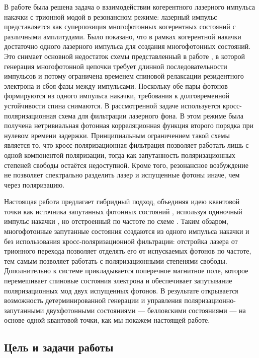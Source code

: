 \documentclass[11pt]{article}    %
\numberwithin{equation}{section}
\begin{document}
В работе \cite{krainov2025} была решена задача о
взаимодействии когерентного лазерного импульса накачки с трионной
модой в резонансном режиме: лазерный импульс представляется как
суперпозиция многофотонных когерентных состояний с различными амплитудами.
Было показано, что в рамках когерентной накачки
достаточно одного лазерного импульса для создания многофотонных состояний.
Это снимает основной недостаток схемы представленный в работе \cite{lindner2009}, в которой генерация
многофотонной цепочки требует длинной последовательности импульсов и потому
ограничена временем спиновой релаксации резидентного электрона и сбоя фазы между
импульсами. Поскольку обе пары фотонов формируются из одного импульса накачки,
требования к долговременной устойчивости спина снимаются.
В рассмотренной задаче используется кросс-поляризационная схема для фильтрации
лазерного фона. В этом режиме была получена нетривиальная фотонная
корреляционная функция второго порядка при нулевом времени задержки.
Принципиальным ограничением такой схемы является то, что кросс-поляризационная
фильтрация позволяет работать лишь с одной компонентой поляризации,
тогда как запутанность поляризационных степеней свободы остаётся недоступной.
Кроме того, резонансное возбуждение не позволяет спектрально разделить
лазер и испущенные фотоны иначе, чем через поляризацию.

Настоящая работа предлагает гибридный подход, объединяя идею
квантовой точки как источника запутанных фотонных состояний \cite{lindner2009},
используя одиночный импульс накачки \cite{krainov2025},
но отстроенный по частоте по схеме \cite{he2019}. Таким обзаром,
многофотонные запутанные состояния создаются из одного
импульса накачки и без использования кросс-поляризационной фильтрации:
отстройка лазера от трионного перехода позволяет отделять его от испускаемых
фотонов по частоте, тем самым позволяет работать с поляризационными степенями свободы.
Дополнительно к системе прикладывается поперечное магнитное поле, которое
перемешивает спиновые состояния электрона и обеспечивает запутывание
поляризационных мод двух испущенных фотонов.
В результате открывается возможность детерминированной генерации и управления
поляризационно-запутанными двухфотонными состояниями --- белловскими состояниями
--- на основе одной квантовой точки, как мы покажем настоящей работе.

\subsection*{Цель и задачи работы}
\end{document}
